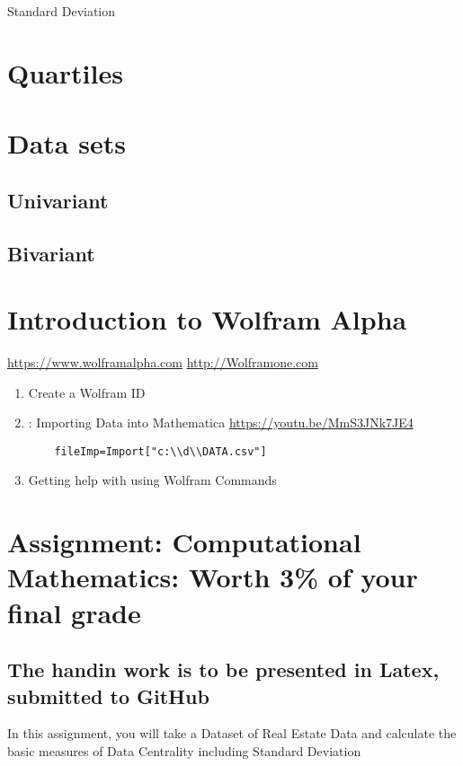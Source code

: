 \documentclass[16pt]{article}
\begin{document}
Standard Deviation

\section * {Quartiles}
\section * {Data sets}
\subsection   {Univariant}
\subsection   {Bivariant}

\section{Introduction to Wolfram Alpha }

\url{https://www.wolframalpha.com}
\url{http://Wolframone.com}

\begin{enumerate}
    \item Create a Wolfram ID
    \item: Importing Data into Mathematica \url{https://youtu.be/MmS3JNk7JE4}
    \begin{verbatim}
    fileImp=Import["c:\\d\\DATA.csv"]
    \end{verbatim}
    \item   Getting help with using Wolfram Commands
\end{enumerate}
  
\section{Assignment: Computational Mathematics: Worth 3\% of your final grade}  
\subsection{The handin work is to be presented in Latex, submitted to GitHub}

In this assignment, you will take a Dataset of Real Estate Data and calculate the basic measures of Data Centrality including Standard Deviation
\end{document}
